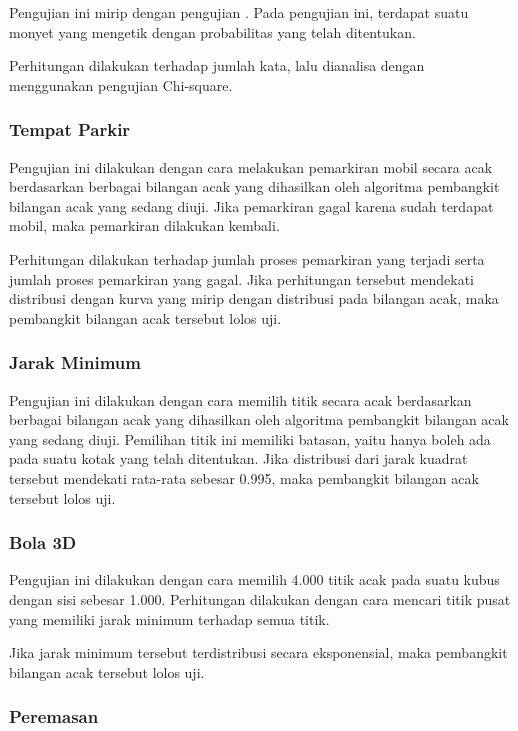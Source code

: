 \documentclass[conference]{IEEEtran}
\begin{document}
Pengujian ini mirip dengan pengujian .
Pada pengujian ini, terdapat suatu monyet yang mengetik dengan probabilitas yang telah ditentukan.

Perhitungan dilakukan terhadap jumlah kata, lalu dianalisa dengan menggunakan pengujian Chi-square.

\subsubsection{Tempat Parkir}

Pengujian ini dilakukan dengan cara melakukan pemarkiran mobil secara acak berdasarkan berbagai bilangan acak yang dihasilkan oleh algoritma pembangkit bilangan acak yang sedang diuji.
Jika pemarkiran gagal karena sudah terdapat mobil, maka pemarkiran dilakukan kembali.

Perhitungan dilakukan terhadap jumlah proses pemarkiran yang terjadi serta jumlah proses pemarkiran yang gagal. Jika perhitungan tersebut mendekati distribusi dengan kurva yang mirip dengan distribusi pada bilangan acak, maka pembangkit bilangan acak tersebut lolos uji.

\subsubsection{Jarak Minimum}

Pengujian ini dilakukan dengan cara memilih titik secara acak berdasarkan berbagai bilangan acak yang dihasilkan oleh algoritma pembangkit bilangan acak yang sedang diuji.
Pemilihan titik ini memiliki batasan, yaitu hanya boleh ada pada suatu kotak yang telah ditentukan.
Jika distribusi dari jarak kuadrat tersebut mendekati rata-rata sebesar 0.995, maka pembangkit bilangan acak tersebut lolos uji.

\subsubsection{Bola 3D}

Pengujian ini dilakukan dengan cara memilih 4.000 titik acak pada suatu kubus dengan sisi sebesar 1.000.
Perhitungan dilakukan dengan cara mencari titik pusat yang memiliki jarak minimum terhadap semua titik.

Jika jarak minimum tersebut terdistribusi secara eksponensial, maka pembangkit bilangan acak tersebut lolos uji.

\subsubsection{Peremasan}
\end{document}
